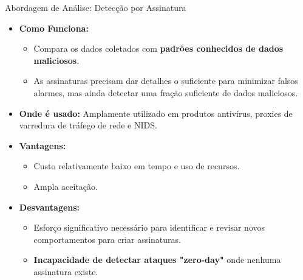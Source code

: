 \begin{frame}{Abordagem de Análise: Detecção por Assinatura }
    \begin{itemize}

        \item \textbf{Como Funciona:}
              \begin{itemize}
                  \item Compara os dados coletados com \textbf{padrões conhecidos de dados maliciosos}.
                  \item As assinaturas precisam dar detalhes o suficiente para minimizar falsos alarmes, mas ainda detectar uma fração suficiente de dados maliciosos.
              \end{itemize}

        \item \textbf{Onde é usado:} Amplamente utilizado em produtos antivírus, proxies de varredura de tráfego de rede e NIDS.

        \item \textbf{Vantagens:}
              \begin{itemize}
                  \item Custo relativamente baixo em tempo e uso de recursos.
                  \item Ampla aceitação.
              \end{itemize}

        \item \textbf{Desvantagens:}
              \begin{itemize}
                  \item Esforço significativo necessário para identificar e revisar novos comportamentos para criar assinaturas.
                  \item \textbf{Incapacidade de detectar ataques "zero-day"} onde nenhuma assinatura existe.
              \end{itemize}
    \end{itemize}
\end{frame}

